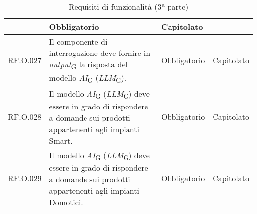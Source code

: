 \begin{table}[H]
\begin{tabular}{|C{2.7cm}|L{7.2cm}|C{2.7cm}|C{2cm}|}
         & Obbligatorio & Capitolato \\
        \hline
        RF.O.027 & Il componente di interrogazione deve fornire in \textit{output}\textsubscript{G} la risposta del modello \textit{AI}\textsubscript{G} (\textit{LLM}\textsubscript{G}).
         & Obbligatorio & Capitolato \\
        \hline
        RF.O.028 & Il modello \textit{AI}\textsubscript{G} (\textit{LLM}\textsubscript{G}) deve essere in grado di rispondere a domande sui prodotti appartenenti agli impianti Smart.
         & Obbligatorio & Capitolato \\
        \hline
        RF.O.029 & Il modello \textit{AI}\textsubscript{G} (\textit{LLM}\textsubscript{G}) deve essere in grado di rispondere a domande sui prodotti appartenenti agli impianti Domotici.
         & Obbligatorio & Capitolato \\
        \hline
    \end{tabular}
    \caption{Requisiti di funzionalità (3\textsuperscript{a}  parte)}
\end{table}
